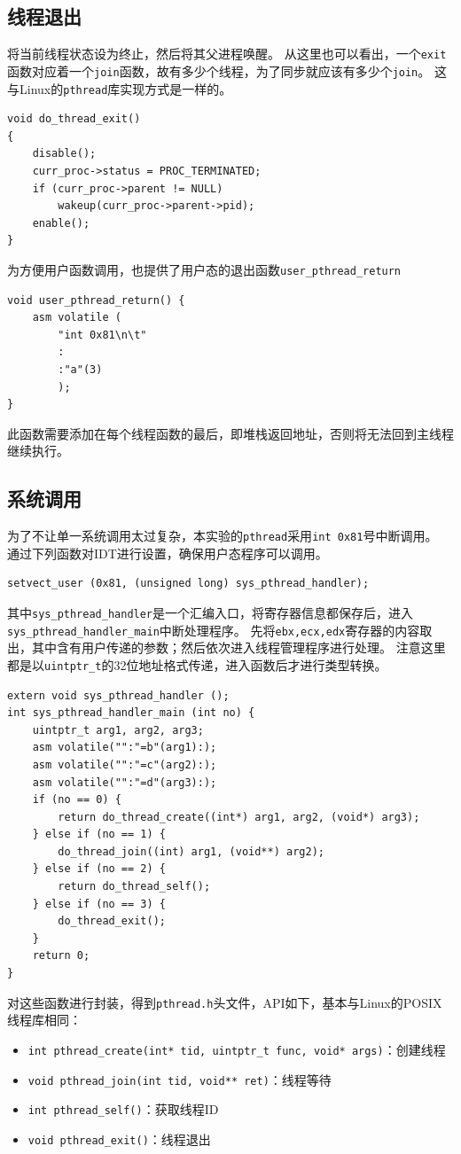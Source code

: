 \documentclass[logo,reportComp]{thesis}
\begin{document}
\subsection{线程退出}
将当前线程状态设为终止，然后将其父进程唤醒。
从这里也可以看出，一个\verb'exit'函数对应着一个\verb'join'函数，故有多少个线程，为了同步就应该有多少个\verb'join'。
这与Linux的\verb'pthread'库实现方式是一样的。
\begin{lstlisting}
void do_thread_exit()
{
	disable();
	curr_proc->status = PROC_TERMINATED;
	if (curr_proc->parent != NULL)
		wakeup(curr_proc->parent->pid);
	enable();
}
\end{lstlisting}

为方便用户函数调用，也提供了用户态的退出函数\verb'user_pthread_return'
\begin{lstlisting}
void user_pthread_return() {
	asm volatile (
		"int 0x81\n\t"
		:
		:"a"(3)
		);
}
\end{lstlisting}

此函数需要添加在每个线程函数的最后，即堆栈返回地址，否则将无法回到主线程继续执行。

\subsection{系统调用}
为了不让单一系统调用太过复杂，本实验的\verb'pthread'采用\verb'int 0x81'号中断调用。
通过下列函数对IDT进行设置，确保用户态程序可以调用。
\begin{lstlisting}
setvect_user (0x81, (unsigned long) sys_pthread_handler);
\end{lstlisting}

其中\verb'sys_pthread_handler'是一个汇编入口，将寄存器信息都保存后，进入\verb'sys_pthread_handler_main'中断处理程序。
先将\verb'ebx,ecx,edx'寄存器的内容取出，其中含有用户传递的参数；然后依次进入线程管理程序进行处理。
注意这里都是以\verb'uintptr_t'的32位地址格式传递，进入函数后才进行类型转换。
\begin{lstlisting}
extern void sys_pthread_handler ();
int sys_pthread_handler_main (int no) {
	uintptr_t arg1, arg2, arg3;
	asm volatile("":"=b"(arg1):);
	asm volatile("":"=c"(arg2):);
	asm volatile("":"=d"(arg3):);
	if (no == 0) {
		return do_thread_create((int*) arg1, arg2, (void*) arg3);
	} else if (no == 1) {
		do_thread_join((int) arg1, (void**) arg2);
	} else if (no == 2) {
		return do_thread_self();
	} else if (no == 3) {
		do_thread_exit();
	}
	return 0;
}
\end{lstlisting}

对这些函数进行封装，得到\verb'pthread.h'头文件，API如下，基本与Linux的POSIX线程库相同：
\begin{itemize}
	\item \verb'int pthread_create(int* tid, uintptr_t func, void* args)'：创建线程
	\item \verb'void pthread_join(int tid, void** ret)'：线程等待
	\item \verb'int pthread_self()'：获取线程ID
	\item \verb'void pthread_exit()'：线程退出
\end{itemize}
\end{document}
